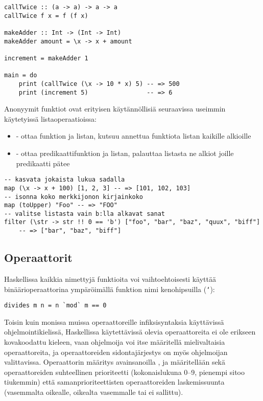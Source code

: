 \begin{verbatim}
callTwice :: (a -> a) -> a -> a
callTwice f x = f (f x)

makeAdder :: Int -> (Int -> Int)
makeAdder amount = \x -> x + amount

increment = makeAdder 1

main = do
    print (callTwice (\x -> 10 * x) 5) -- => 500
    print (increment 5)                -- => 6
\end{verbatim}
Anonyymit funktiot ovat erityisen käytännöllisiä seuraavissa useimmin käytetyissä listaoperaatioissa:
\begin{itemize}
    \item {} - ottaa funktion ja listan, kutsuu annettua funktiota listan kaikille alkioille
    \item {} - ottaa predikaattifunktion ja listan, palauttaa listasta ne alkiot joille predikaatti pätee
\end{itemize}
\begin{verbatim}
-- kasvata jokaista lukua sadalla
map (\x -> x + 100) [1, 2, 3] -- => [101, 102, 103]
-- isonna koko merkkijonon kirjainkoko
map (toUpper) "Foo" -- => "FOO"
-- valitse listasta vain b:lla alkavat sanat
filter (\str -> str !! 0 == 'b') ["foo", "bar", "baz", "quux", "biff"]
    -- => ["bar", "baz", "biff"]
\end{verbatim}

\subsection{Operaattorit}
Haskellissa kaikkia nimettyjä funktioita voi vaihtoehtoisesti käyttää binäärioperaattorina ympäröimällä funktion nimi kenohipsuilla (\texttt{`}):
\begin{verbatim}
divides m n = n `mod` m == 0
\end{verbatim}

Toisin kuin monissa muissa operaattoreille infiksisyntaksia käyttävissä ohjelmointikielissä,
Haskellissa käytettävissä olevia operaattoreita ei ole erikseen kovakoodattu kieleen,
vaan ohjelmoija voi itse määritellä mielivaltaisia operaattoreita,
ja operaattoreiden sidontajärjestys on myös ohjelmoijan valittavissa.
Operaattorin määritys avainsanoilla ,  ja  määritellään sekä
operaattoreiden suhteellinen prioriteetti (kokonaislukuna 0--9, pienempi sitoo tiukemmin) että
samanprioriteettisten operaattoreiden laskemissuunta
(vasemmalta oikealle, oikealta vasemmalle tai ei sallittu).


